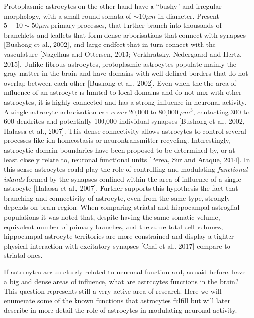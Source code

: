 Protoplasmic astrocytes on the other hand have a “bushy” and irregular morphology, with a small round somata of $\sim 10 \mu m$ in diameter.
Present $5-10 \sim 50 \mu m$ primary processes, that further branch into thousands of branchlets and leaflets that form dense arborisations that connect with synapses [Bushong et al., 2002], and large endfeet that in turn connect with the vasculature [Nagelhus and Ottersen, 2013; Verkhratsky, Nedergaard and Hertz, 2015].
Unlike fibrous astrocytes, protoplasmic astrocytes populate mainly the gray matter in the brain and have domains with well defined borders that do not overlap between each other [Bushong et al., 2002].
Even when the the area of influence of an astrocyte is limited to local domains and do not mix with other astrocytes, it is highly connected and has a strong influence in neuronal activity.  
A single astrocyte arborisation can cover 20,000 to 80,000 $\mu m^3$, contacting 300 to 600 dendrites and potentially 100,000 individual synapses [Bushong et al., 2002, Halassa et al., 2007].
This dense connectivity allows astrocytes to control several processes like ion homeostasis or neurontransmitter recycling.
Interestingly, astrocytic domain boundaries have been proposed to be determined by, or at least closely relate to, neuronal functional units [Perea, Sur and Araque, 2014].
In this sense astrocytes could play the role of controlling and modulating \textit{functional islands} formed by the synapses confined within the area of influence of a single astrocyte [Halassa et al., 2007].
Further supports this hypothesis the fact that branching and connectivity of astrocyte, even from the same type, strongly depends on brain region.  
When comparing striatal and hippocampal astroglial populations it was noted that, despite having the same somatic volume, equivalent number of primary branches, and the same total cell volumes, hippocampal astrocyte territories are more constrained and display a tighter physical interaction with excitatory synapses [Chai et al., 2017] compare to striatal ones.

If astrocytes are so closely related to neuronal function and, as said before, have a big and dense areas of influence, what are astrocytes functions in the brain? 
This question represents still a very active area of research. Here we will enumerate some of the known functions that astrocytes fulfill but will later describe in more detail the role of astrocytes in modulating neuronal activity. 

